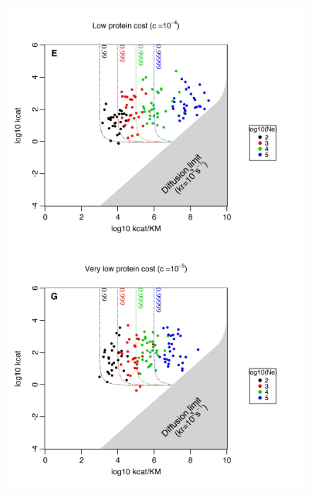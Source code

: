 \begin{figure}[!p]
\begin{center}
\begin{minipage}[c]{0.6\textwidth}
\begin{center}
    \includegraphics[scale=0.52,trim=0cm 0cm 0cm 0cm,clip]{pics/SM-Enzymes/Evo_Results_CostCrow_L.jpeg}
    \includegraphics[scale=0.52,trim=0cm 0cm 0cm 0cm,clip]{pics/SM-Enzymes/Evo_Results_CostCrow_VL.jpeg}
    \end{center}
  \end{minipage}\hfill
  \begin{minipage}[c]{0.4\textwidth}

\end{minipage}
\end{center}
\end{figure}
